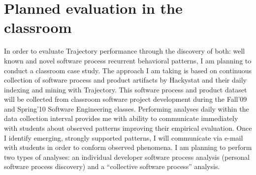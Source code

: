 \section{Planned evaluation in the classroom}\label{classroom}
In order to evaluate Trajectory performance through the discovery of both: well known and novel software process recurrent behavioral patterns, I am planning to conduct a classroom case study. The approach I am taking is based on continuous collection of software process and product artifacts by Hackystat and their daily indexing and mining with Trajectory. This software process and product dataset will be collected from classroom software project development during the Fall'09 and Spring'10 Software Engineering classes. Performing analyses daily within the data collection interval provides me with ability to communicate immediately with students about observed patterns improving their empirical evaluation. Once I identify emerging, strongly supported patterns, I will communicate via e-mail with students in order to conform observed phenomena. I am planning to perform two types of analyses: an individual developer software process analysis (personal software process discovery) and a ``collective software process'' analysis.

